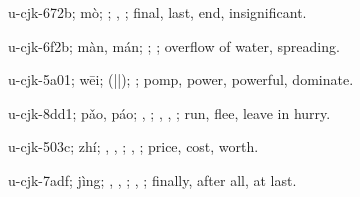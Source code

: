 \begin{multicols}{2}
{\cjkgGlue{}u-cjk-672b; mò; \cjkgGlue{}; \cjkgGlue{}, \cjkgGlue{}; final, last, end, insignificant.

\cjkgGlue{}u-cjk-6f2b; màn, mán; \cjkgGlue{}; \cjkgGlue{}; overflow of water, spreading.

\cjkgGlue{}u-cjk-5a01; wēi; \cjkgGlue{}\cjkgGlue{}(\cjkgGlue{}|\cjkgGlue{}|\cjkgGlue{}); \cjkgGlue{}; pomp, power, powerful, dominate.

\cjkgGlue{}u-cjk-8dd1; pǎo, páo; \cjkgGlue{}, \cjkgGlue{}\cjkgGlue{}\cjkgGlue{}; \cjkgGlue{}, \cjkgGlue{}, \cjkgGlue{}; run, flee, leave in hurry.

\cjkgGlue{}u-cjk-503c; zhí; \cjkgGlue{}, \cjkgGlue{}, \cjkgGlue{}; \cjkgGlue{}, \cjkgGlue{}; price, cost, worth.

\cjkgGlue{}u-cjk-7adf; jìng; \cjkgGlue{}\cjkgGlue{}\cjkgGlue{}, \cjkgGlue{}, \cjkgGlue{}\cjkgGlue{}\cjkgGlue{}; \cjkgGlue{}, \cjkgGlue{}; finally, after all, at last.

}
\end{multicols}
